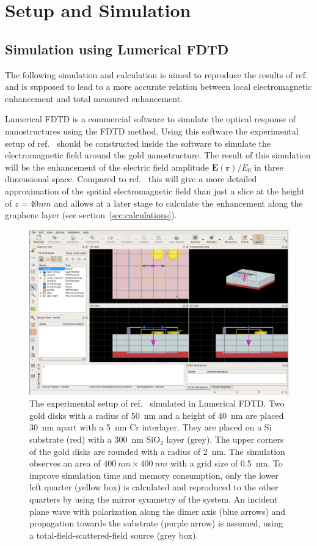 \newpage
\section{Setup and Simulation}
\subsection{Simulation using Lumerical FDTD}

The following simulation and calculation is aimed to reproduce the results of ref.~\cite{heeg} and is supposed to lead to a more accurate relation between local electromagnetic enhancement and total measured enhancement.

Lumerical FDTD is a commercial software to simulate the optical response of nanostructures using the FDTD method. Using this software the experimental setup of ref.~\cite{heeg} should be constructed inside the software to simulate the electromagnetic field around the gold nanostructure. The result of this simulation will be the enhancement of the electric field amplitude $\mathbf{E}(\mathbf{r})/E_0$ in three dimensional space. Compared to ref.~\cite{heeg} this will give a more detailed approximation of the spatial electromagnetic field than just a slice at the height of $z=40nm$ and allows at a later stage to calculate the enhancement along the graphene layer (see section~\ref{sec:calculations}).

\begin{figure}[!h]
  \includegraphics[width=\textwidth]{./images/lumerical.png}
  \caption{The experimental setup of ref.~\cite{heeg} simulated in Lumerical FDTD. Two gold disks with a radius of \SI{50}{nm} and a height of \SI{40}{nm} are placed \SI{30}{nm} apart with a \SI{5}{nm} Cr interlayer. They are placed on a Si substrate (red) with a \SI{300}{nm} SiO$_2$ layer (grey). The upper corners of the gold disks are rounded with a radius of \SI{2}{nm}. The simulation observes an area of $\SI{400}{nm}\times\SI{400}{nm}$ with a grid size of \SI{0.5}{nm}. To improve simulation time and memory consumption, only the lower left quarter (yellow box) is calculated and reproduced to the other quarters by using the mirror symmetry of the system. An incident plane wave with polarization along the dimer axis (blue arrows) and propagation towards the substrate (purple arrow) is assumed, using a total-field-scattered-field source (grey box).}
  \label{fig:lumerical}
\end{figure}

